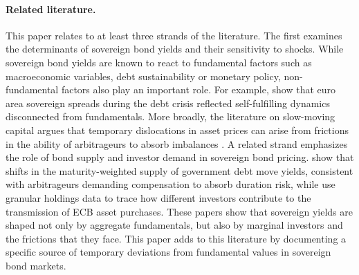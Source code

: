 \documentclass[english, 11pt, oneside]{article}
\begin{document}
\paragraph{Related literature.} This paper relates to at least three strands of the literature. The first examines the determinants of sovereign bond yields and their sensitivity to shocks. While sovereign bond yields are known to react to fundamental factors such as macroeconomic variables, debt sustainability or monetary policy, non-fundamental factors also play an important role. For example, \citet{degauwe2013} show that euro area sovereign spreads during the debt crisis reflected self-fulfilling dynamics disconnected from fundamentals. More broadly, the literature on slow-moving capital argues that temporary dislocations in asset prices can arise from frictions in the ability of arbitrageurs to absorb imbalances \citep{duffie2010, mitchell2007}. A related strand emphasizes the role of bond supply and investor demand in sovereign bond pricing. \citet{greenwood2014} show that shifts in the maturity-weighted supply of government debt move yields, consistent with arbitrageurs demanding compensation to absorb duration risk, while \citet{koijen2021} use granular holdings data to trace how different investors contribute to the transmission of ECB asset purchases. These papers show that sovereign yields are shaped not only by aggregate fundamentals, but also by marginal investors and the frictions that they face. This paper adds to this literature by documenting a specific source of temporary deviations from fundamental values in sovereign bond markets.
\end{document}
